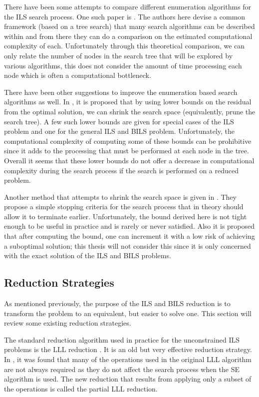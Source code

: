 \documentclass[12pt,Bold,letterpaper]{mcgilletdclass}
\newcommand{\vsp}{\vspace{\baselineskip}}
\begin{document}
There have been some attempts to compare different enumeration algorithms for the ILS search process. One such paper is \cite{MurGDC06}. The authors here devise a common framework (based on a tree search) that many search algorithms can be described within and from there they can do a comparison on the estimated computational complexity of each. Unfortunately through this theoretical comparison, we can only relate the number of nodes in the search tree that will be explored by various algorithms, this does not consider the amount of time processing each node which is often a computational bottleneck.

There have been other suggestions to improve the enumeration based search algorithms as well. In \cite{StoVH08}, it is proposed that by using lower bounds on the residual from the optimal solution, we can shrink the search space (equivalently, prune the search tree). A few such lower bounds are given for special cases of the ILS problem and one for the general ILS and BILS problem. Unfortunately, the computational complexity of computing some of these bounds can be prohibitive since it adds to the processing that must be performed at each node in the tree. Overall it seems that these lower bounds do not offer a decrease in computational complexity during the search process if the search is performed on a reduced problem.

Another method that attempts to shrink the search space is given in \cite{SchFL09}. They propose a simple stopping criteria for the search process that in theory should allow it to terminate earlier. Unfortunately, the bound derived here is not tight enough to be useful in practice and is rarely or never satisfied. Also it is proposed that after computing the bound, one can increment it with a low risk of achieving a suboptimal solution; this thesis will not consider this since it is only concerned with the exact solution of the ILS and BILS problems. 

\vsp \subsection{Reduction Strategies}

As mentioned previously, the purpose of the ILS and BILS reduction is to transform the problem to an equivalent, but easier to solve one. This section will review some existing reduction strategies.

The standard reduction algorithm used in practice for the unconstrained ILS problems is the LLL reduction \cite{LenLL82}. It is an old but very effective reduction strategy. In \cite{Bor10}, it was found that many of the operations used in the original LLL algorithm are not always required as they do not affect the search process when the SE algorithm is used. The new reduction that results from applying only a subset of the operations is called the partial LLL reduction.
\end{document}
